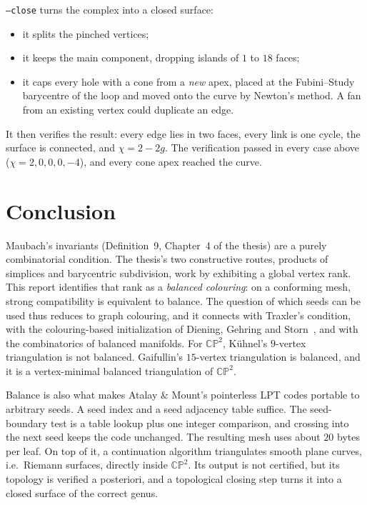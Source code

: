 \documentclass[11pt]{article}
\newcommand{\CP}{\mathbb{CP}}
\begin{document}
\texttt{--close} turns the complex into a closed surface:
\begin{itemize}
\item it splits the pinched vertices;
\item it keeps the main component, dropping islands of $1$ to $18$ faces;
\item it caps every hole with a cone from a \emph{new} apex, placed at
  the Fubini--Study barycentre of the loop and moved onto the curve by
  Newton's method. A fan from an existing vertex could duplicate an
  edge.
\end{itemize}
It then verifies the result: every edge lies in two faces, every link is
one cycle, the surface is connected, and $\chi=2-2g$. The verification
passed in every case above ($\chi=2,0,0,0,-4$), and every cone apex
reached the curve.


\section{Conclusion}

Maubach's invariants (Definition~9, Chapter~4 of the thesis) are a
purely combinatorial condition. The thesis's two constructive routes,
products of simplices and barycentric subdivision, work by exhibiting a
global vertex rank. This report identifies that rank as a
\emph{balanced colouring}: on a conforming mesh, strong compatibility is
equivalent to balance. The question of which seeds can be used thus
reduces to graph colouring, and it connects with Traxler's condition,
with the colouring-based initialization of Diening, Gehring and
Storn~\cite{dgs2025}, and with the combinatorics of balanced manifolds.
For $\CP^2$, Kühnel's $9$-vertex triangulation is not balanced. Gaifullin's
$15$-vertex triangulation is balanced, and it is a vertex-minimal
balanced triangulation of $\CP^2$.

Balance is also what makes Atalay \& Mount's pointerless LPT codes
portable to arbitrary seeds. A seed index and a seed adjacency table
suffice. The seed-boundary test is a table lookup plus one integer
comparison, and crossing into the next seed keeps the code unchanged.
The resulting mesh uses about $20$ bytes per leaf. On top of it, a
continuation algorithm triangulates smooth plane curves, i.e.\ Riemann
surfaces, directly inside $\CP^2$. Its output is not certified, but its
topology is verified a posteriori, and a topological closing step turns
it into a closed surface of the correct genus.
\end{document}
